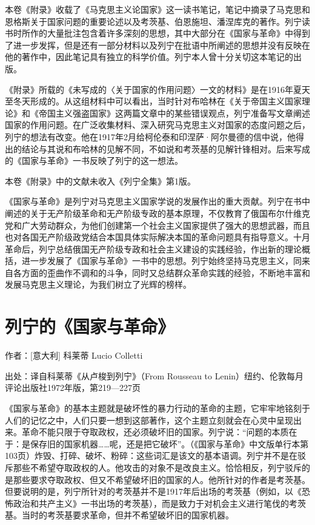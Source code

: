 \documentclass[UTF8, 12pt, a4paper]{ctexrep}
\begin{document}
本卷《附录》收载了《马克思主义论国家》这一读书笔记，笔记中摘录了马克思和恩格斯关于国家问题的重要论述以及考茨基、伯恩施坦、潘涅库克的著作。列宁读书时所作的大量批注包含着许多深刻的思想，其中大部分在《国家与革命》中得到了进一步发挥，但是还有一部分材料以及列宁在批语中所阐述的思想并没有反映在他的著作中，因此笔记具有独立的科学价值。列宁本人曾十分关切这本笔记的出版。

《附录》所载的《未写成的〈关于国家的作用问题〉一文的材料》是在1916年夏天至冬天形成的。从这组材料中可以看出，当时针对布哈林在《关于帝国主义国家理论》和《帝国主义强盗国家》这两篇文章中的某些错误观点，列宁准备写文章阐述国家的作用问题。在广泛收集材料、深入研究马克思主义对国家的态度问题之后，列宁的想法有改变。他在1917年2月给柯伦泰和印涅萨·阿尔曼德的信中说，他得出的结论与其说和布哈林的见解不同，不如说和考茨基的见解针锋相对。后来写成的《国家与革命》一书反映了列宁的这一想法。

本卷《附录》中的文献未收入《列宁全集》第1版。

《国家与革命》是列宁对马克思主义国家学说的发展作出的重大贡献。列宁在书中阐述的关于无产阶级革命和无产阶级专政的基本原理，不仅教育了俄国布尔什维克党和广大劳动群众，为他们创建第一个社会主义国家提供了强大的思想武器，而且也对各国无产阶级政党结合本国具体实际解决本国的革命问题具有指导意义。十月革命后，列宁总结俄国无产阶级专政和社会主义建设的实践经验，作出新的理论概括，进一步发展了《国家与革命》一书中的思想。列宁始终坚持马克思主义，同来自各方面的歪曲作不调和的斗争，同时又总结群众革命实践的经验，不断地丰富和发展马克思主义理论，为我们树立了光辉的榜样。

\chapter*{列宁的《国家与革命》}

作者：[意大利] 科莱蒂 Lucio Colletti

出处：译自科莱蒂《从卢梭到列宁》（From Rousseau to Lenin）纽约、伦敦每月评论出版社1972年版，第219—227页

《国家与革命》的基本主题就是破坏性的暴力行动的革命的主题，它牢牢地铭刻于人们的记忆之中，人们只要一想到这部著作，这个主题立刻就会在心灵中呈现出来。革命不能只限于夺取政权，还必须破坏旧的国家。列宁说：“问题的本质在于：是保存旧的国家机器……呢，还是把它破坏”。（《国家与革命》中文版单行本第103页）炸毁、打碎、破坏、粉碎：这些词汇是该文的基本语调。列宁并不是在驳斥那些不希望夺取政权的人。他攻击的对象不是改良主义。恰恰相反，列宁驳斥的是那些要求夺取政权、但又不希望破坏旧的国家的人。他所针对的作者是考茨基。但要说明的是，列宁所针对的考茨基并不是1917年后出场的考茨基（例如，以《恐怖政治和共产主义》一书出场的考茨基），而是致力于对机会主义进行笔伐的考茨基。当时的考茨基要求革命，但并不希望破坏旧的国家机器。
\end{document}
